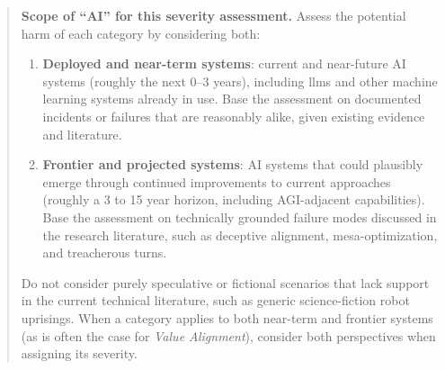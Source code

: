 	\begin{quote}
	\textbf{Scope of ``AI'' for this severity assessment.} Assess the potential harm of each category by considering both:

	\begin{enumerate}
		\item \textbf{Deployed and near-term systems}: current and near-future AI systems (roughly the next 0--3 years), including \glspl{llm} and other machine learning systems already in use. Base the assessment on documented incidents or failures that are reasonably alike, given existing evidence and literature.

		\item \textbf{Frontier and projected systems}: AI systems that could plausibly emerge through continued improvements to current approaches (roughly a 3 to 15 year horizon, including AGI-adjacent capabilities). Base the assessment on technically grounded failure modes discussed in the research literature, such as deceptive alignment, mesa-optimization, and treacherous turns.
	\end{enumerate}

	Do not consider purely speculative or fictional scenarios that lack support in the current technical literature, such as generic science-fiction robot uprisings. When a category applies to both near-term and frontier systems (as is often the case for \emph{Value Alignment}), consider both perspectives when assigning its severity.
	\end{quote}


